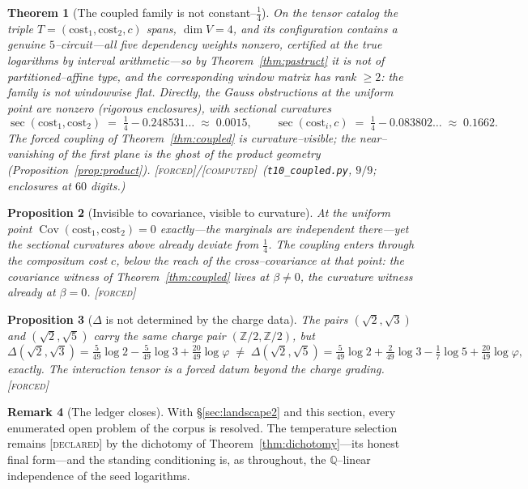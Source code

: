 \documentclass[11pt]{article}
\newtheorem{theorem}{Theorem}[section]
\newtheorem{proposition}[theorem]{Proposition}
\theoremstyle{definition}
\newtheorem{remark}[theorem]{Remark}
\newcommand{\ph}{\varphi}
\newcommand{\Q}{\mathbb{Q}}
\newcommand{\Z}{\mathbb{Z}}
\newcommand{\Cov}{\operatorname{Cov}}
\newcommand{\forcedtag}{{\scshape [forced]}}
\newcommand{\declaredtag}{{\scshape [declared]}}
\newcommand{\computedtag}{{\scshape [computed]}}
\begin{document}
\begin{theorem}[The coupled family is not constant--$\tfrac14$]\label{thm:coupcurv}
On the tensor catalog the triple $T=(\mathrm{cost}_1,\mathrm{cost}_2,c)$ spans, $\dim V=4$, and
its configuration contains a genuine $5$--circuit---all five dependency weights nonzero,
certified at the true logarithms by interval arithmetic---so by Theorem~\ref{thm:pastruct} it is
\emph{not} of partitioned--affine type, and the corresponding window matrix has rank $\ge2$: the
family is not windowwise flat. Directly, the Gauss obstructions at the uniform point are nonzero
(rigorous enclosures), with sectional curvatures
\[
\sec(\mathrm{cost}_1,\mathrm{cost}_2)\;=\;\tfrac14-0.248531\ldots\;\approx\;0.0015,
\qquad
\sec(\mathrm{cost}_i,c)\;=\;\tfrac14-0.083802\ldots\;\approx\;0.1662 .
\]
The forced coupling of Theorem~\ref{thm:coupled} is curvature--visible; the near--vanishing of
the first plane is the ghost of the product geometry (Proposition~\ref{prop:product}).
\forcedtag/\computedtag\ (\texttt{t10\_coupled.py}, $9/9$; enclosures at $60$ digits.)
\end{theorem}

\begin{proposition}[Invisible to covariance, visible to curvature]\label{prop:covinvis}
At the uniform point $\Cov(\mathrm{cost}_1,\mathrm{cost}_2)=0$ exactly---the marginals are
independent there---yet the sectional curvatures above already deviate from $\tfrac14$. The
coupling enters through the compositum cost $c$, below the reach of the cross--covariance at
that point: the covariance witness of Theorem~\ref{thm:coupled} lives at $\beta\ne0$, the
curvature witness already at $\beta=0$. \forcedtag
\end{proposition}

\begin{proposition}[$\Delta$ is not determined by the charge data]\label{prop:deltacharge}
The pairs $(\sqrt2,\sqrt3)$ and $(\sqrt2,\sqrt5)$ carry the same charge pair $(\Z/2,\Z/2)$, but
\[
\Delta(\sqrt2,\sqrt3)=\tfrac{5}{49}\log2-\tfrac{5}{49}\log3+\tfrac{20}{49}\log\ph
\;\ne\;
\Delta(\sqrt2,\sqrt5)=\tfrac{5}{49}\log2+\tfrac{2}{49}\log3-\tfrac17\log5+\tfrac{20}{49}\log\ph,
\]
exactly. The interaction tensor is a forced datum beyond the charge grading. \forcedtag
\end{proposition}

\begin{remark}[The ledger closes]\label{rem:closed}
With \S\ref{sec:landscape2} and this section, every enumerated open problem of the corpus is
resolved. The temperature selection remains \declaredtag{} by the dichotomy of
Theorem~\ref{thm:dichotomy}---its honest final form---and the standing conditioning is, as
throughout, the $\Q$--linear independence of the seed logarithms.
\end{remark}
\end{document}
